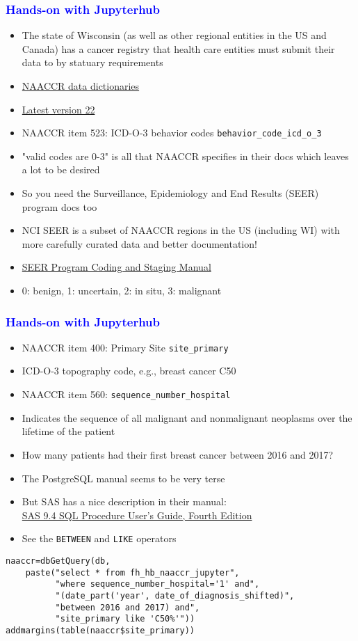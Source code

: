\documentclass[11pt,pdftex,dvipsnames,usenames]{beamer}
\begin{document}
\begin{frame}[fragile]\frametitle{\bf\textcolor{blue}{Hands-on with Jupyterhub}}
\begin{itemize}
\item The state of Wisconsin (as well as other regional entities in the US
and Canada) has a cancer registry that health care entities must
submit their data to by statuary requirements
\item \href{https://www.naaccr.org/data-standards-data-dictionary}
{NAACCR data dictionaries}
\item 
\href{http://datadictionary.naaccr.org/default.aspx?c=10&Version=22}
{Latest version 22}
\item NAACCR item 523: ICD-O-3 behavior codes \texttt{behavior\_code\_icd\_o\_3}
\item "valid codes are 0-3" is all that NAACCR specifies in their docs which leaves a lot to be desired
\item So you need the Surveillance, Epidemiology
and End Results (SEER) program docs too 
\item NCI SEER is a subset of NAACCR
regions in the US (including WI) with more carefully curated data
and better documentation!
\item \href{https://seer.cancer.gov/manuals/2022/SPCSM_2022_MainDoc.pdf}
{SEER Program Coding and Staging Manual}
\item 0: benign, 1: uncertain, 2: in situ, 3: malignant
\end{itemize}
\end{frame}

\begin{frame}[fragile]\frametitle{\bf\textcolor{blue}{Hands-on with Jupyterhub}}
\begin{itemize}
\item NAACCR item 400: Primary Site \texttt{site\_primary}
\item ICD-O-3 topography code, e.g., breast cancer C50
\item NAACCR item 560: \texttt{sequence\_number\_hospital}
\item Indicates the sequence of all malignant and nonmalignant
neoplasms over the lifetime of the patient
\item How many patients had their first breast cancer between
2016 and 2017?
\item The PostgreSQL manual seems to be very terse
\item But SAS has a nice description in their manual: \\
\href{https://documentation.sas.com/doc/en/pgmsascdc/9.4_3.5/sqlproc/titlepage.htm}{SAS 9.4 SQL Procedure User’s Guide, Fourth Edition}
\item See the \texttt{BETWEEN} and \texttt{LIKE} operators
\end{itemize}
\begin{verbatim}
naaccr=dbGetQuery(db, 
    paste("select * from fh_hb_naaccr_jupyter",
          "where sequence_number_hospital='1' and",
          "(date_part('year', date_of_diagnosis_shifted)",
          "between 2016 and 2017) and",
          "site_primary like 'C50%'"))
addmargins(table(naaccr$site_primary))
\end{verbatim}
\end{frame}
\end{document}
